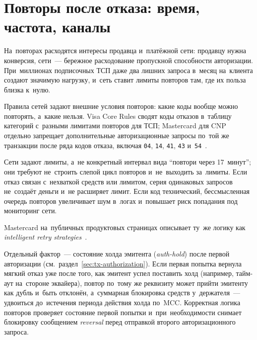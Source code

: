 \section{Повторы после отказа: время, частота, каналы}\label{sec:decline-retry}

На~повторах расходятся интересы продавца и~платёжной сети: продавцу нужна
конверсия, сети~--- бережное расходование пропускной способности авторизации.
При~миллионах подписочных ТСП даже два лишних запроса в~месяц на~клиента
создают значимую нагрузку, и~сеть ставит лимиты повторов там, где их польза
близка к~нулю.

Правила сетей задают внешние условия повторов: какие коды вообще можно
повторять, а~какие нельзя. Visa Core Rules сводят коды отказов в~таблицу
категорий с~разными лимитами повторов для ТСП; Mastercard для CNP отдельно
запрещает дополнительные авторизационные запросы по~той же транзакции после
ряда кодов отказа, включая \texttt{04}, \texttt{14}, \texttt{41}, \texttt{43}
и~\texttt{54}~\cite{visa-core-rules,mc-tpr}.

Сети задают лимиты, а~не конкретный интервал вида \enquote{повтори через
17~минут}; они требуют не~строить слепой цикл повторов и~не~выходить
за~лимиты. Если отказ
связан с~нехваткой средств или лимитом, серия одинаковых запросов не~создаёт
деньги и~не расширяет лимит. Если код технический, бессмысленная очередь
повторов увеличивает шум в~логах и~повышает риск попадания под мониторинг сети.

 Mastercard на~публичных продуктовых
страницах описывает ту~же логику как \textit{intelligent retry
strategies}~\cite{mc-bill-pay-solutions}.

Отдельный фактор~--- состояние холда эмитента (\textit{auth-hold}) после первой
авторизации (см.~раздел~\ref{sec:tx-authorization}). Если первая попытка
вернула мягкий отказ уже после того, как эмитент успел поставить холд
(например, тайм-аут на~стороне эквайера), повтор по~тому же реквизиту может
прийти эмитенту как дубль и~быть отклонён, а~суммарная блокировка средств
у~держателя~--- удвоиться до~истечения периода действия холда по~MCC. Корректная
логика повторов проверяет состояние первой попытки и~при~необходимости снимает
блокировку сообщением \textit{reversal} перед отправкой второго авторизационного запроса.


